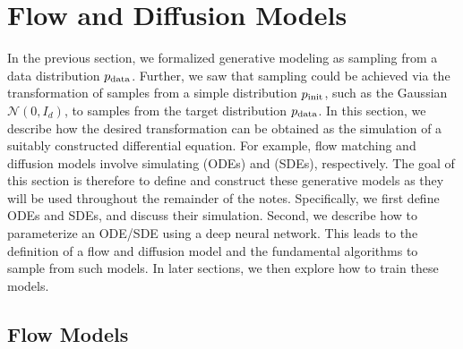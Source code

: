 \section{Flow and Diffusion Models}
\label{sec:odes_sdes}
In the previous section, we formalized generative modeling as sampling from a data distribution $p_{\rm{data}}$. Further, we saw that sampling could be achieved via the transformation of samples from a simple distribution $p_{\rm{init}}$, such as the Gaussian $\mathcal{N}(0,I_d)$, to samples from the target distribution $p_{\rm{data}}$. In this section, we describe how the desired transformation can be obtained as the simulation of a suitably constructed differential equation. For example, flow matching and diffusion models involve simulating  (ODEs) and  (SDEs), respectively. The goal of this section is therefore to define and construct these generative models as they will be used throughout the remainder of the notes. Specifically, we first define ODEs and SDEs, and discuss their simulation. Second, we describe how to parameterize an ODE/SDE using a deep neural network. This leads to the definition of a flow and diffusion model and the fundamental algorithms to sample from such models. In later sections, we then explore how to train these models.


\subsection{Flow Models}

